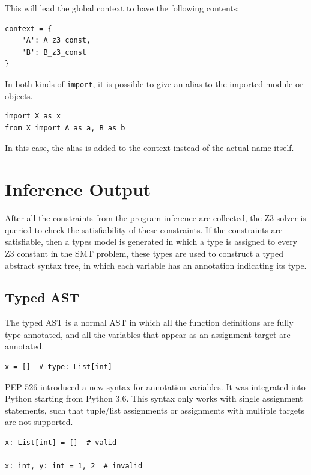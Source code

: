 This will lead the global context to have the following contents:
\begin{lstlisting}
context = {
	'A': A_z3_const,
	'B': B_z3_const
}
\end{lstlisting}

In both kinds of \lstinline|import|, it is possible to give an alias to the imported module or objects.
\begin{lstlisting}
import X as x
from X import A as a, B as b
\end{lstlisting}

In this case, the alias is added to the context instead of the actual name itself.
\section{Inference Output}
After all the constraints from the program inference are collected, the Z3 solver is queried to check the satisfiability of these constraints. If the constraints are satisfiable, then a types model is generated in which a type is assigned to every Z3 constant in the SMT problem, these types are used to construct a typed abstract syntax tree, in which each variable has an annotation indicating its type.
\subsection{Typed AST}
The typed AST is a normal AST in which all the function definitions are fully type-annotated, and all the variables that appear as an assignment target are annotated.

\begin{lstlisting}
x = []  # type: List[int]
\end{lstlisting}

PEP 526 \cite{526} introduced a new syntax for annotation variables. It was integrated into Python starting from Python 3.6. This syntax only works with single assignment statements, such that tuple/list assignments or assignments with multiple targets are not supported.

\begin{lstlisting}
x: List[int] = []  # valid

x: int, y: int = 1, 2  # invalid
\end{lstlisting}

